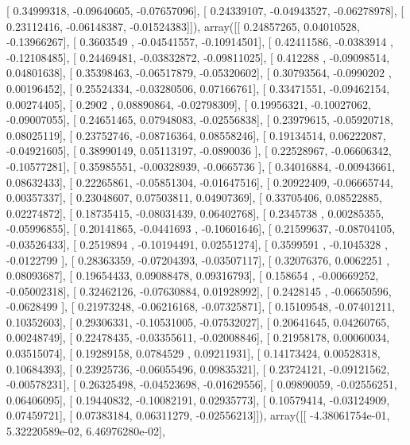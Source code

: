 \documentclass{article}
\begin{document}
       [ 0.34999318, -0.09640605, -0.07657096],
       [ 0.24339107, -0.04943527, -0.06278978],
       [ 0.23112416, -0.06148387, -0.01524383]]), array([[ 0.24857265,  0.04010528, -0.13966267],
       [ 0.3603549 , -0.04541557, -0.10914501],
       [ 0.42411586, -0.0383914 , -0.12108485],
       [ 0.24469481, -0.03832872, -0.09811025],
       [ 0.412288  , -0.09098514,  0.04801638],
       [ 0.35398463, -0.06517879, -0.05320602],
       [ 0.30793564, -0.0990202 ,  0.00196452],
       [ 0.25524334, -0.03280506,  0.07166761],
       [ 0.33471551, -0.09462154,  0.00274405],
       [ 0.2902    ,  0.08890864, -0.02798309],
       [ 0.19956321, -0.10027062, -0.09007055],
       [ 0.24651465,  0.07948083, -0.02556838],
       [ 0.23979615, -0.05920718,  0.08025119],
       [ 0.23752746, -0.08716364,  0.08558246],
       [ 0.19134514,  0.06222087, -0.04921605],
       [ 0.38990149,  0.05113197, -0.0890036 ],
       [ 0.22528967, -0.06606342, -0.10577281],
       [ 0.35985551, -0.00328939, -0.0665736 ],
       [ 0.34016884, -0.00943661,  0.08632433],
       [ 0.22265861, -0.05851304, -0.01647516],
       [ 0.20922409, -0.06665744,  0.00357337],
       [ 0.23048607,  0.07503811,  0.04907369],
       [ 0.33705406,  0.08522885,  0.02274872],
       [ 0.18735415, -0.08031439,  0.06402768],
       [ 0.2345738 ,  0.00285355, -0.05996855],
       [ 0.20141865, -0.0441693 , -0.10601646],
       [ 0.21599637, -0.08704105, -0.03526433],
       [ 0.2519894 , -0.10194491,  0.02551274],
       [ 0.3599591 , -0.1045328 , -0.0122799 ],
       [ 0.28363359, -0.07204393, -0.03507117],
       [ 0.32076376,  0.0062251 ,  0.08093687],
       [ 0.19654433,  0.09088478,  0.09316793],
       [ 0.158654  , -0.00669252, -0.05002318],
       [ 0.32462126, -0.07630884,  0.01928992],
       [ 0.2428145 , -0.06650596, -0.0628499 ],
       [ 0.21973248, -0.06216168, -0.07325871],
       [ 0.15109548, -0.07401211,  0.10352603],
       [ 0.29306331, -0.10531005, -0.07532027],
       [ 0.20641645,  0.04260765,  0.00248749],
       [ 0.22478435, -0.03355611, -0.02008846],
       [ 0.21958178,  0.00060034,  0.03515074],
       [ 0.19289158,  0.0784529 ,  0.09211931],
       [ 0.14173424,  0.00528318,  0.10684393],
       [ 0.23925736, -0.06055496,  0.09835321],
       [ 0.23724121, -0.09121562, -0.00578231],
       [ 0.26325498, -0.04523698, -0.01629556],
       [ 0.09890059, -0.02556251,  0.06406095],
       [ 0.19440832, -0.10082191,  0.02935773],
       [ 0.10579414, -0.03124909,  0.07459721],
       [ 0.07383184,  0.06311279, -0.02556213]]), array([[ -4.38061754e-01,   5.32220589e-02,   6.46976280e-02],
\end{document}

